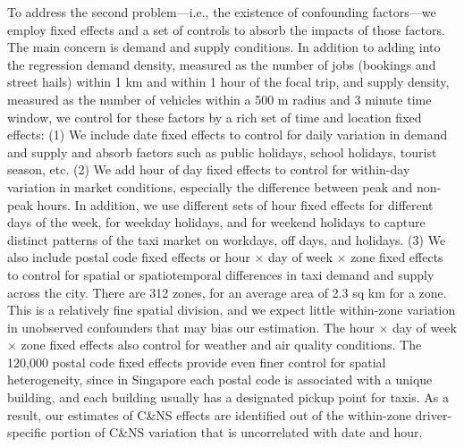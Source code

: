 \documentclass[reviewmode]{restat}
\begin{document}
To address the second problem---i.e., the existence of confounding factors---we employ fixed effects and a
set of controls to absorb the impacts of those factors. The main concern is demand and supply conditions.
In addition to adding  into the regression demand density, measured as the number of jobs (bookings and street 
hails) within 1 km and within 1 hour of the focal trip, and supply density, measured as the number of vehicles
within a 500 m radius and 3 minute time window, we control for these factors by a rich set of time and
location fixed effects: (1) We include date fixed effects to control for daily variation in demand and 
supply and absorb factors such as public holidays, school holidays, tourist season, etc. (2) We add hour 
of day fixed effects to control for within-day variation in market conditions, especially the difference 
between peak and non-peak hours. In addition, we use different sets of hour fixed effects for different days 
of the week, for weekday holidays, and for weekend holidays to capture distinct patterns of the taxi market on 
workdays, off days, and holidays. (3)  We also include postal code fixed effects or hour $\times$ day of week
$\times$ zone fixed effects to control for spatial or spatiotemporal differences in taxi demand and supply
across the city. There are 312 zones, for an average area of 2.3 sq km for a zone. This is a relatively fine
spatial division, and we expect little within-zone variation in unobserved confounders that may bias our 
estimation. The  hour $\times$ day of week $\times$ zone fixed effects also control for weather and air 
quality conditions. The 120,000 postal code fixed effects provide even finer control for spatial 
heterogeneity, since in Singapore each postal code is associated with a unique building, and each building
usually has a designated pickup point for taxis. As a result, our estimates of C\&NS effects are identified 
out of the within-zone driver-specific portion of C\&NS variation that is uncorrelated with date and hour. 
\end{document}
